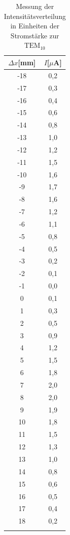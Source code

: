 \begin{table}
\centering
\caption{Messung der Intensitätsverteilung in Einheiten der Stromstärke zur $\text{TEM}_{10}$}
\begin{tabular}{c c}
\toprule
{$\Delta x$[mm]} & {$I$[$\mu$A]}\\
\midrule
-18	&	0,2	\\
-17	&	0,3	\\
-16	&	0,4	\\
-15	&	0,6	\\
-14	&	0,8	\\
-13	&	1,0	\\
-12	&	1,2	\\
-11	&	1,5	\\
-10	&	1,6	\\
-9	&	1,7	\\
-8	&	1,6	\\
-7	&	1,2	\\
-6	&	1,1	\\
-5	&	0,8	\\
-4	&	0,5	\\
-3	&	0,2	\\
-2	&	0,1	\\
-1	&	0,0	\\
0	&	0,1	\\
1	&	0,3	\\
2	&	0,5	\\
3	&	0,9	\\
4	&	1,2	\\
5	&	1,5	\\
6	&	1,8	\\
7	&	2,0	\\
8	&	2,0	\\
9	&	1,9	\\
10	&	1,8	\\
11	&	1,5	\\
12	&	1,3	\\
13	&	1,0	\\
14	&	0,8	\\
15	&	0,6	\\
16	&	0,5	\\
17	&	0,4	\\
18	&	0,2	\\
\bottomrule
\label{tab:TEM_10}
\end{tabular}
\end{table}





